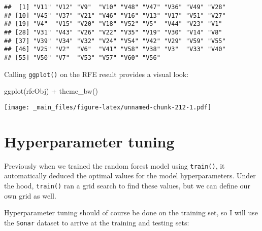 \documentclass[
]{book}
\newenvironment{Shaded}{\begin{snugshade}}{\end{snugshade}}
\newcommand{\AttributeTok}[1]{\textcolor[rgb]{0.77,0.63,0.00}{#1}}
\newcommand{\ConstantTok}[1]{\textcolor[rgb]{0.00,0.00,0.00}{#1}}
\newcommand{\DecValTok}[1]{\textcolor[rgb]{0.00,0.00,0.81}{#1}}
\newcommand{\FunctionTok}[1]{\textcolor[rgb]{0.00,0.00,0.00}{#1}}
\newcommand{\NormalTok}[1]{#1}
\newcommand{\OtherTok}[1]{\textcolor[rgb]{0.56,0.35,0.01}{#1}}
\newcommand{\SpecialCharTok}[1]{\textcolor[rgb]{0.00,0.00,0.00}{#1}}
\newcommand{\StringTok}[1]{\textcolor[rgb]{0.31,0.60,0.02}{#1}}
\begin{document}
\begin{verbatim}
##  [1] "V11" "V12" "V9"  "V10" "V48" "V47" "V36" "V49" "V28"
## [10] "V45" "V37" "V21" "V46" "V16" "V13" "V17" "V51" "V27"
## [19] "V4"  "V15" "V20" "V18" "V52" "V5"  "V44" "V23" "V1" 
## [28] "V31" "V43" "V26" "V22" "V35" "V19" "V30" "V14" "V8" 
## [37] "V39" "V34" "V32" "V24" "V54" "V42" "V29" "V59" "V55"
## [46] "V25" "V2"  "V6"  "V41" "V58" "V38" "V3"  "V33" "V40"
## [55] "V50" "V7"  "V53" "V57" "V60" "V56"
\end{verbatim}

Calling \texttt{ggplot()} on the RFE result provides a visual look:

\begin{Shaded}
\begin{Highlighting}[]
\FunctionTok{ggplot}\NormalTok{(rfeObj) }\SpecialCharTok{+} \FunctionTok{theme\_bw}\NormalTok{()}
\end{Highlighting}
\end{Shaded}

\texttt{[image: \_main\_files/figure-latex/unnamed-chunk-212-1.pdf]}

\hypertarget{hyperparameter-tuning}{%
\section{Hyperparameter tuning}\label{hyperparameter-tuning}}

Previously when we trained the random forest model using \texttt{train()}, it automatically deduced the optimal values for the model hyperparameters. Under the hood, \texttt{train()} ran a grid search to find these values, but we can define our own grid as well.

Hyperparameter tuning should of course be done on the training set, so I will use the \texttt{Sonar} dataset to arrive at the training and testing sets:

\begin{Shaded}
\end{Shaded}
\end{document}

